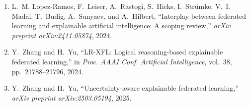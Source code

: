 \documentclass[10pt,twocolumn,letterpaper]{article}
\begin{document}
\begin{enumerate}
\item L.~M. Lopez-Ramos, F.~Leiser, A.~Rastogi, S.~Hicks, I.~Str{\"u}mke, V.~I. Madai, T.~Budig, A.~Sunyaev, and A.~Hilbert, ``Interplay between federated learning and explainable artificial intelligence: A scoping review,'' {\em arXiv preprint arXiv:2411.05874}, 2024.
\item Y.~Zhang and H.~Yu, ``{LR-XFL}: Logical reasoning-based explainable federated learning,'' in {\em Proc. AAAI Conf. Artificial Intelligence}, vol.~38, pp.~21788--21796, 2024.
\item Y.~Zhang and H.~Yu, ``Uncertainty-aware explainable federated learning,'' {\em arXiv preprint arXiv:2503.05194}, 2025.
\end{enumerate}
\end{document}
